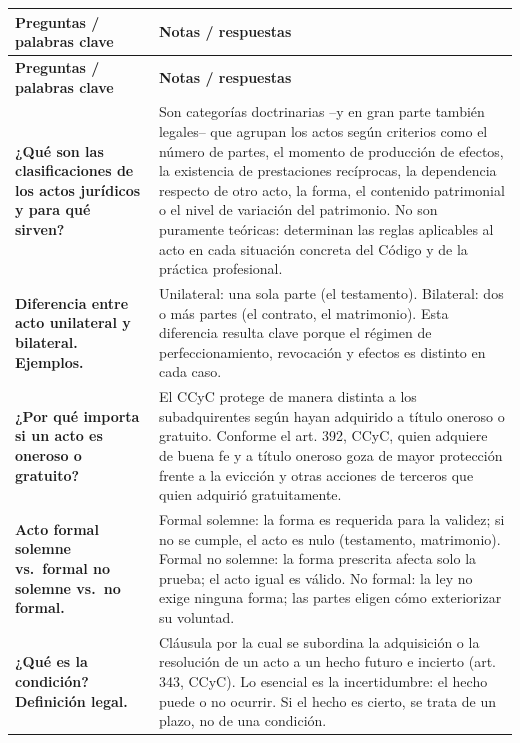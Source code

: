 \documentclass[12pt,oneside]{book}
\begin{document}
\begin{longtable}{
    >{\raggedright\arraybackslash}p{}
    >{\raggedright\arraybackslash}X
}
\toprule
\textbf{Preguntas / palabras clave} & \textbf{Notas / respuestas} \\
\midrule
\endfirsthead
\toprule
\textbf{Preguntas / palabras clave} & \textbf{Notas / respuestas} \\
\midrule
\endhead

\textbf{¿Qué son las clasificaciones de los actos jurídicos y para qué sirven?} &
Son categorías doctrinarias --y en gran parte también legales-- que agrupan los actos según criterios como el número de partes, el momento de producción de efectos, la existencia de prestaciones recíprocas, la dependencia respecto de otro acto, la forma, el contenido patrimonial o el nivel de variación del patrimonio. No son puramente teóricas: determinan las reglas aplicables al acto en cada situación concreta del Código y de la práctica profesional. \\

\textbf{Diferencia entre acto unilateral y bilateral. Ejemplos.} &
Unilateral: una sola parte (el testamento). Bilateral: dos o más partes (el contrato, el matrimonio). Esta diferencia resulta clave porque el régimen de perfeccionamiento, revocación y efectos es distinto en cada caso. \\

\textbf{¿Por qué importa si un acto es oneroso o gratuito?} &
El CCyC protege de manera distinta a los subadquirentes según hayan adquirido a título oneroso o gratuito. Conforme el art. 392, CCyC, quien adquiere de buena fe y a título oneroso goza de mayor protección frente a la evicción y otras acciones de terceros que quien adquirió gratuitamente. \\

\textbf{Acto formal solemne vs.\ formal no solemne vs.\ no formal.} &
Formal solemne: la forma es requerida para la validez; si no se cumple, el acto es nulo (testamento, matrimonio). Formal no solemne: la forma prescrita afecta solo la prueba; el acto igual es válido. No formal: la ley no exige ninguna forma; las partes eligen cómo exteriorizar su voluntad. \\

\textbf{¿Qué es la condición? Definición legal.} &
Cláusula por la cual se subordina la adquisición o la resolución de un acto a un hecho futuro e incierto (art. 343, CCyC). Lo esencial es la incertidumbre: el hecho puede o no ocurrir. Si el hecho es cierto, se trata de un plazo, no de una condición. \\


\end{longtable}
\end{document}
